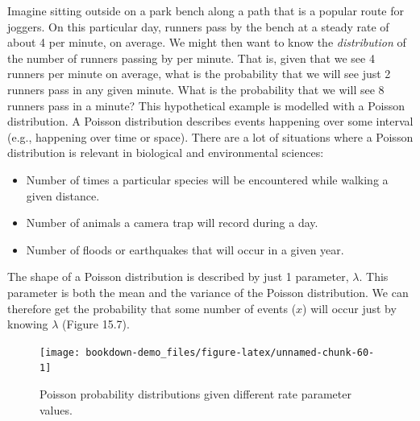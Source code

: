 \documentclass[
]{scrbook}
\providecommand{\tightlist}{%
  \setlength{\itemsep}{0pt}\setlength{\parskip}{0pt}}
\begin{document}
Imagine sitting outside on a park bench along a path that is a popular route for joggers.
On this particular day, runners pass by the bench at a steady rate of about 4 per minute, on average.
We might then want to know the \emph{distribution} of the number of runners passing by per minute.
That is, given that we see 4 runners per minute on average, what is the probability that we will see just 2 runners pass in any given minute.
What is the probability that we will see 8 runners pass in a minute?
This hypothetical example is modelled with a Poisson distribution.
A Poisson distribution describes events happening over some interval (e.g., happening over time or space).
There are a lot of situations where a Poisson distribution is relevant in biological and environmental sciences:

\begin{itemize}
\tightlist
\item
  Number of times a particular species will be encountered while walking a given distance.
\item
  Number of animals a camera trap will record during a day.
\item
  Number of floods or earthquakes that will occur in a given year.
\end{itemize}

The shape of a Poisson distribution is described by just 1 parameter, \(\lambda\).
This parameter is both the mean and the variance of the Poisson distribution.
We can therefore get the probability that some number of events (\(x\)) will occur just by knowing \(\lambda\) (Figure 15.7).

\begin{figure}
\texttt{[image: bookdown-demo\_files/figure-latex/unnamed-chunk-60-1]} \caption{Poisson probability distributions given different rate parameter values.}\label{fig:unnamed-chunk-60}
\end{figure}
\end{document}
